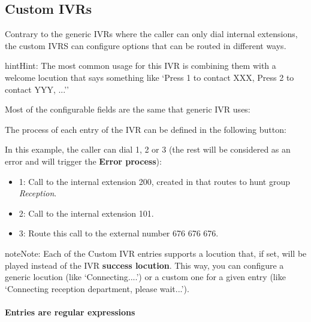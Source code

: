 \documentclass[letterpaper,10pt,english]{sphinxmanual}
\begin{document}
\subsection{Custom IVRs}
\label{pbx_features/ivrs:id2}\label{pbx_features/ivrs:custom-ivrs}
Contrary to the generic IVRs where the caller can only dial internal
extensions, the custom IVRS can configure options that can be routed
in different ways.

\begin{notice}{hint}{Hint:}
The most common usage for this IVR is combining them with a welcome
locution that says something like `Press 1 to contact XXX, Press 2 to
contact YYY, ...''
\end{notice}

Most of the configurable fields are the same that generic IVR uses:

The process of each entry of the IVR can be defined in the following button:

\noindent{}

In this example, the caller can dial 1, 2 or 3 (the rest will be considered as
an error and will trigger the \textbf{Error process}):

\noindent{}
\begin{itemize}
\item {} 
1: Call to the internal extension 200, created in {\hyperref[pbx_features/huntgroups:huntgroups]{}} that routes to hunt group \emph{Reception}.

\item {} 
2: Call to the internal extension 101.

\item {} 
3: Route this call to the external number 676 676 676.

\end{itemize}

\begin{notice}{note}{Note:}
Each of the Custom IVR entries supports a locution that, if set,
will be played instead of the IVR \textbf{success locution}. This way, you can
configure a generic locution (like `Connecting....') or a custom one for
a given entry (like `Connecting reception department, please wait...').
\end{notice}
\paragraph{Entries are regular expressions}
\end{document}
